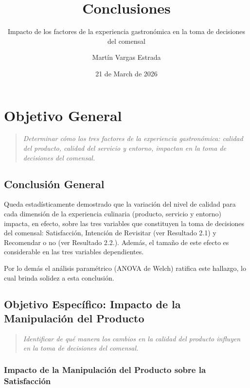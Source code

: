 \documentclass[
  spanish,
]{article}
\title{Conclusiones}
\subtitle{Impacto de los factores de la experiencia gastronómica en la
toma de decisiones del comensal}
\author{Martín Vargas Estrada}
\date{21 de March de 2026}
\begin{document}
\maketitle

{
\setcounter{tocdepth}{3}
\tableofcontents
}
\newpage

\section{Objetivo General}\label{objetivo-general}

\begin{quote}
\emph{Determinar cómo los tres factores de la experiencia gastronómica:
calidad del producto, calidad del servicio y entorno, impactan en la
toma de decisiones del comensal.}
\end{quote}

\subsection{Conclusión General}\label{conclusiuxf3n-general}

Queda estadísticamente demostrado que la variación del nivel de calidad
para cada dimensión de la experiencia culinaria (producto, servicio y
entorno) impacta, en efecto, sobre las tres variables que constituyen la
toma de decisiones del comensal: Satisfacción, Intención de Revisitar
(ver Resultado 2.1) y Recomendar o no (ver Resultado 2.2.). Además, el
tamaño de este efecto es considerable en las tres variables
dependientes.

Por lo demás el análisis paramétrico (ANOVA de Welch) ratifica este
hallazgo, lo cual brinda solidez a esta conclusión.

\subsection{Objetivo Específico: Impacto de la Manipulación del
Producto}\label{objetivo-especuxedfico-impacto-de-la-manipulaciuxf3n-del-producto}

\begin{quote}
\emph{Identificar de qué manera los cambios en la calidad del producto
influyen en la toma de decisiones del comensal.}
\end{quote}

\subsubsection{Impacto de la Manipulación del Producto sobre la
Satisfacción}\label{impacto-de-la-manipulaciuxf3n-del-producto-sobre-la-satisfacciuxf3n}
\end{document}

